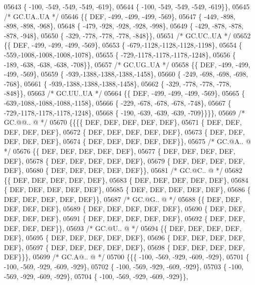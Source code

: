 \begin{DoxyCode}
05643 \{ -100, -549, -549, -549, -619\},
05644 \{ -100, -549, -549, -549, -619\}\},
05645 \textcolor{comment}{/* GC.UA..UA */}
05646 \{\{  DEF, -499, -499, -499, -569\},
05647 \{ -449, -898, -898, -898, -968\},
05648 \{ -479, -928, -928, -928, -998\},
05649 \{ -429, -878, -878, -878, -948\},
05650 \{ -329, -778, -778, -778, -848\}\},
05651 \textcolor{comment}{/* GC.UC..UA */}
05652 \{\{  DEF, -499, -499, -499, -569\},
05653 \{ -679,-1128,-1128,-1128,-1198\},
05654 \{ -559,-1008,-1008,-1008,-1078\},
05655 \{ -729,-1178,-1178,-1178,-1248\},
05656 \{ -189, -638, -638, -638, -708\}\},
05657 \textcolor{comment}{/* GC.UG..UA */}
05658 \{\{  DEF, -499, -499, -499, -569\},
05659 \{ -939,-1388,-1388,-1388,-1458\},
05660 \{ -249, -698, -698, -698, -768\},
05661 \{ -939,-1388,-1388,-1388,-1458\},
05662 \{ -329, -778, -778, -778, -848\}\},
05663 \textcolor{comment}{/* GC.UU..UA */}
05664 \{\{  DEF, -499, -499, -499, -569\},
05665 \{ -639,-1088,-1088,-1088,-1158\},
05666 \{ -229, -678, -678, -678, -748\},
05667 \{ -729,-1178,-1178,-1178,-1248\},
05668 \{ -190, -639, -639, -639, -709\}\}\}\},
05669 \textcolor{comment}{/* GC.@@.. @ */}
05670 \{\{\{\{  DEF,  DEF,  DEF,  DEF,  DEF\},
05671 \{  DEF,  DEF,  DEF,  DEF,  DEF\},
05672 \{  DEF,  DEF,  DEF,  DEF,  DEF\},
05673 \{  DEF,  DEF,  DEF,  DEF,  DEF\},
05674 \{  DEF,  DEF,  DEF,  DEF,  DEF\}\},
05675 \textcolor{comment}{/* GC.@A.. @ */}
05676 \{\{  DEF,  DEF,  DEF,  DEF,  DEF\},
05677 \{  DEF,  DEF,  DEF,  DEF,  DEF\},
05678 \{  DEF,  DEF,  DEF,  DEF,  DEF\},
05679 \{  DEF,  DEF,  DEF,  DEF,  DEF\},
05680 \{  DEF,  DEF,  DEF,  DEF,  DEF\}\},
05681 \textcolor{comment}{/* GC.@C.. @ */}
05682 \{\{  DEF,  DEF,  DEF,  DEF,  DEF\},
05683 \{  DEF,  DEF,  DEF,  DEF,  DEF\},
05684 \{  DEF,  DEF,  DEF,  DEF,  DEF\},
05685 \{  DEF,  DEF,  DEF,  DEF,  DEF\},
05686 \{  DEF,  DEF,  DEF,  DEF,  DEF\}\},
05687 \textcolor{comment}{/* GC.@G.. @ */}
05688 \{\{  DEF,  DEF,  DEF,  DEF,  DEF\},
05689 \{  DEF,  DEF,  DEF,  DEF,  DEF\},
05690 \{  DEF,  DEF,  DEF,  DEF,  DEF\},
05691 \{  DEF,  DEF,  DEF,  DEF,  DEF\},
05692 \{  DEF,  DEF,  DEF,  DEF,  DEF\}\},
05693 \textcolor{comment}{/* GC.@U.. @ */}
05694 \{\{  DEF,  DEF,  DEF,  DEF,  DEF\},
05695 \{  DEF,  DEF,  DEF,  DEF,  DEF\},
05696 \{  DEF,  DEF,  DEF,  DEF,  DEF\},
05697 \{  DEF,  DEF,  DEF,  DEF,  DEF\},
05698 \{  DEF,  DEF,  DEF,  DEF,  DEF\}\}\},
05699 \textcolor{comment}{/* GC.A@.. @ */}
05700 \{\{\{ -100, -569, -929, -609, -929\},
05701 \{ -100, -569, -929, -609, -929\},
05702 \{ -100, -569, -929, -609, -929\},
05703 \{ -100, -569, -929, -609, -929\},
05704 \{ -100, -569, -929, -609, -929\}\},

\end{DoxyCode}

